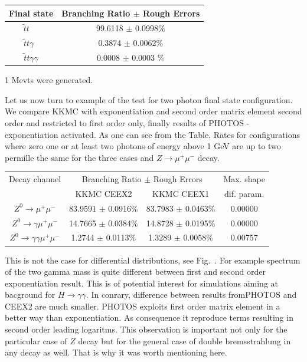 \documentclass[]{Photos_interface_design}
\begin{document}
\vspace{0.3cm} 
\begin{center}
{ \begin{tabular}{|c|c |} 
\hline 
Final state &  Branching Ratio  $\pm$ Rough Errors \\  
\hline 
\hline 
{$ \widetilde{t} t \; \;\; \;$}  &  {99.6118 $\pm$  0.0998\%}  \\ 
\hline 
 {$  \widetilde{t} t \gamma \;\;$} &   { 0.3874 $\pm$  0.0062\%}   \\ 
\hline 
{$  \widetilde{t} t \gamma \gamma$}  &  { 0.0008 $\pm$  0.0003 \%}  \\ 
\hline 
\end{tabular} 
}  
\end{center} 
1 Mevts were generated. 

Let us now turn to example of the test for two photon final state configuration.
We compare KKMC \cite{} with exponentiation and second order matrix element 
second order and restricted to first order only, finally results of PHOTOS - exponentiation activated. As one can see from the Table. Rates for configurations 
where zero one or at least two photons of energy above 1 GeV are up to two
permille the same for the three cases and $Z\to \mu^+\mu^-$ decay. 

{\centering \begin{tabular}{|c|c|c|c|} 
\hline 
Decay channel &\multicolumn{2}{|c|}{ Branching Ratio $\pm$ Rough Errors} & Max. shape\\ 
      & {KKMC CEEX2} & {KKMC CEEX1} & dif. param.\\ 
\hline 
\hline 
 {$Z^{0} \rightarrow \mu^{+} \mu^{-} $} & {83.9591 $\pm$  0.0916\%} &{  83.7983 $\pm$  0.0463\%} & 0.00000 \\ 
\hline 
\hline 
 {$Z^{0} \rightarrow \gamma \mu^{+} \mu^{-} $} & {14.7665 $\pm$  0.0384\%} &{  14.8728 $\pm$  0.0195\%} & 0.00000 \\ 
\hline 
\hline 
{$Z^{0} \rightarrow \gamma \gamma \mu^{+} \mu^{-} $} & { 1.2744 $\pm$  0.0113\%} &{   1.3289 $\pm$  0.0058\%} & 0.00757 \\ 
\hline 
\end{tabular}\par} 
This is not the case for differential distributions, see Fig.~\cite{fig:gamgam}. For example spectrum of 
the two gamma mass is quite different between first and second order 
exponentiation result. This is of potential interest for simulations aiming at 
bacground for $H \to \gamma \gamma$. In conrary, difference between results fromPHOTOS and CEEX2 are much smaller. PHOTOS exploits first order matrix element 
in a better way than exponentiation. As consequence it reproduce terms resulting in second order leading logaritms. This observation is important not only for 
the particular case of $Z$ decay but for the general case of double bremsstrahlung in any decay as well. That is why it was worth mentioning here.
\end{document}
